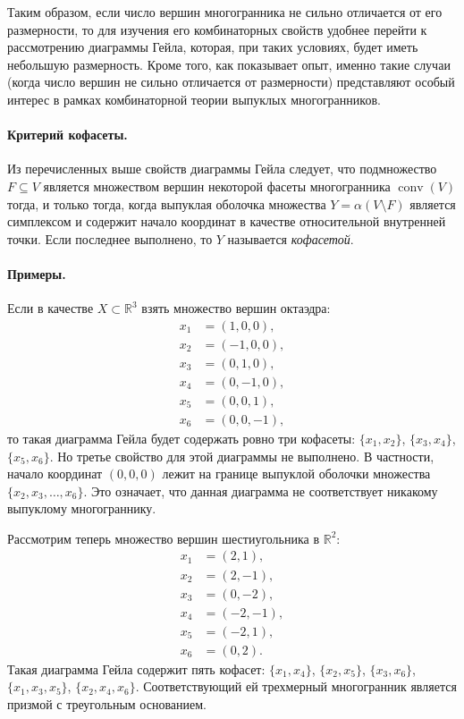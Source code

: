 \documentclass[12pt]{article}
\newcommand{\R}{\mathbb{R}}
\DeclareMathOperator{\conv}{conv}
\begin{document}
Таким образом, если число вершин многогранника не сильно отличается от его размерности, то для изучения его комбинаторных свойств удобнее перейти к рассмотрению диаграммы Гейла, которая, при таких условиях, будет иметь небольшую размерность. Кроме того, как показывает опыт, именно такие случаи (когда число вершин не сильно отличается от размерности) представляют особый интерес в рамках комбинаторной теории выпуклых многогранников. 

\paragraph{Критерий кофасеты.}
Из перечисленных выше свойств диаграммы Гейла следует, что 
подмножество $F \subseteq V$ является множеством вершин некоторой фасеты многогранника $\conv(V)$ тогда, и только тогда, когда выпуклая оболочка множества $Y = \alpha(V \setminus F)$ является симплексом и содержит начало координат в качестве относительной внутренней точки.
Если последнее выполнено, то $Y$ называется \emph{кофасетой}.


\paragraph{Примеры.}
Если в качестве $X\subset \R^3$ взять множество вершин октаэдра:
\[
\begin{aligned}
x_1 &= (1, 0, 0), \\
x_2 &= (-1, 0, 0), \\
x_3 &= (0, 1, 0), \\
x_4 &= (0, -1, 0), \\
x_5 &= (0, 0, 1), \\
x_6 &= (0, 0, -1), 
\end{aligned}
\]
то такая диаграмма Гейла будет содержать ровно три кофасеты: $\{x_1, x_2\}$, $\{x_3, x_4\}$, $\{x_5, x_6\}$.
Но третье свойство для этой диаграммы не выполнено.
В частности, начало координат $(0, 0, 0)$ лежит на границе выпуклой оболочки множества $\{x_2, x_3, \dots, x_6\}$.
Это означает, что данная диаграмма не соответствует никакому выпуклому многограннику.

Рассмотрим теперь множество вершин шестиугольника в $\R^2$: 
\[
\begin{aligned}
x_1 &= (2,  1), \\
x_2 &= (2, -1), \\
x_3 &= (0, -2), \\
x_4 &= (-2, -1), \\
x_5 &= (-2,  1), \\
x_6 &= (0, 2).
\end{aligned}
\]
Такая диаграмма Гейла содержит пять кофасет:
$\{x_1, x_4\}$, $\{x_2, x_5\}$, $\{x_3, x_6\}$, $\{x_1, x_3, x_5\}$, $\{x_2, x_4, x_6\}$. Соответствующий ей трехмерный многогранник является призмой с треугольным основанием.
\end{document}
